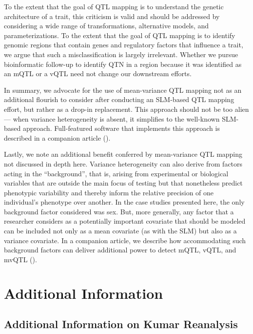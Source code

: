     To the extent that the goal of QTL mapping is to understand the genetic architecture of a trait, this criticism is valid and should be addressed by considering a wide range of transformations, alternative models, and parameterizations.
    To the extent that the goal of QTL mapping is to identify genomic regions that contain genes and regulatory factors that influence a trait, we argue that such a misclassification is largely irrelevant.
    Whether we pursue bioinformatic follow-up to identify QTN in a region because it was identified as an mQTL or a vQTL need not change our downstream efforts.

    In summary, we advocate for the use of mean-variance QTL mapping not as an additional flourish to consider after conducting an SLM-based QTL mapping effort, but rather as a drop-in replacement.
    This approach should not be too alien --- when variance heterogeneity is absent, it simplifies to the well-known SLM-based approach.
    Full-featured software that implements this approach is described in a companion article (\CortyRPaper).

    Lastly, we note an additional benefit conferred by mean-variance QTL mapping not discussed in depth here.
    Variance heterogeneity can also derive from factors acting in the ``background'', that is, arising from experimental or biological variables that are outside the main focus of testing but that nonetheless predict phenotypic variability and thereby inform the relative precision of one individual's phenotype over another.
    In the case studies presented here, the only background factor considered was sex.
    But, more generally, any factor that a researcher considers as a potentially important covariate that should be modeled can be included not only as a mean covariate (as with the SLM) but also as a variance covariate.
    In a companion article, we describe how accommodating such background factors can deliver additional power to detect mQTL, vQTL, and mvQTL (\CortyMethodsPaper).


\section{Additional Information}
    
    \subsection{Additional Information on Kumar Reanalysis}

